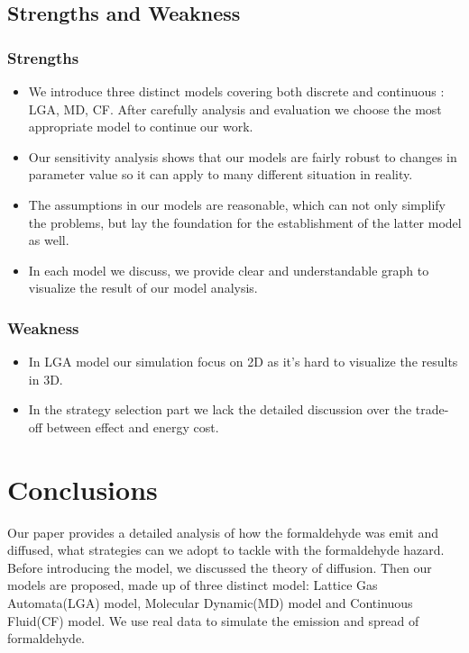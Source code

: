 \documentclass{mcmthesis}
\begin{document}
\subsection{Strengths and Weakness}

\subsubsection{Strengths}
\begin{itemize}
\item We introduce three distinct models covering both discrete and continuous : LGA, MD, CF. After carefully analysis and evaluation we choose the most appropriate model to continue our work.
\item Our sensitivity analysis shows that our models are fairly robust to changes in parameter value so it can apply to many different situation in reality.
\item The assumptions in our models are reasonable, which can not only simplify the problems, but lay the foundation for the establishment of the latter model as well. 
\item In each model we discuss, we provide clear
and understandable graph to visualize the result of our model analysis.
\end{itemize}
 
\subsubsection{Weakness}
\begin{itemize}

\item In LGA model our simulation focus on 2D as it's hard to visualize the results in 3D.
\item In the strategy selection part we lack the detailed discussion over the trade-off between effect and energy cost.
 \end{itemize}

\section{Conclusions}

Our paper provides a detailed analysis of how the formaldehyde was emit and diffused, what strategies can we adopt to tackle with the formaldehyde hazard. Before introducing the model, we discussed the theory of diffusion. Then our models are proposed, made up of three distinct model: Lattice Gas Automata(LGA) model, Molecular Dynamic(MD) model and Continuous Fluid(CF) model. We use real data to simulate the emission and spread of formaldehyde.  
\end{document}
